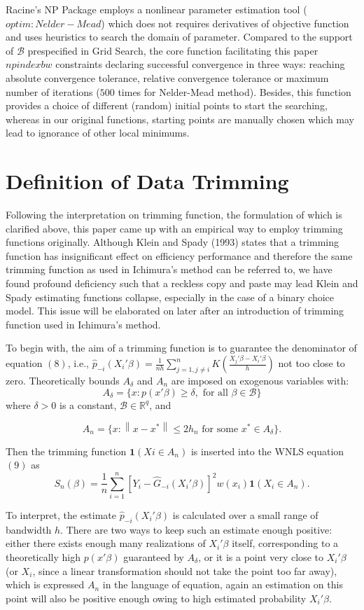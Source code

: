 \documentclass[a4paper]{article}
\newcommand{\norm}[1]{\left\lVert#1\right\rVert}
\begin{document}
Racine's NP Package employs a nonlinear parameter estimation tool ($optim: Nelder-Mead$) which does not requires derivatives of objective function and uses heuristics to search the domain of parameter. Compared to the support of $\mathcal{B}$ prespecified in Grid Search, the core function facilitating this paper $npindexbw$ constraints declaring successful convergence in three ways: reaching absolute convergence tolerance, relative convergence tolerance or maximum number of iterations ($500$ times for Nelder-Mead method). Besides, this function provides a choice of different (random) initial points to start the searching, whereas in our original functions, starting points are manually chosen which may lead to ignorance of other local minimums.

\section{Definition of Data Trimming}
Following the interpretation on trimming function, the formulation of which is clarified above, this paper came up with an empirical way to employ trimming functions originally. Although Klein and Spady (1993) states that a trimming function has insignificant effect on efficiency performance and therefore the same trimming function as used in Ichimura's method can be referred to, we have found profound deficiency such that a reckless copy and paste may lead Klein and Spady estimating functions collapse, especially in the case of a binary choice model. This issue will be elaborated on later after an introduction of trimming function used in Ichimura's method.

To begin with, the aim of a trimming function is to guarantee the denominator of equation $(8)$, i.e., $\hat{p}_{-i}(X_i'\beta) = \frac{1}{nh}\sum_{j=1,j \neq i}^{n}K(\frac{X_j'\beta - X_i'\beta}{h})$ not too close to zero. Theoretically bounds $A_\delta$ and $A_n$ are imposed on exogenous variables with:
\[ A_\delta = \{ x : p(x'\beta) \geq \delta, \text{ for all }  \beta \in \mathcal{B} \}
\]
where $\delta > 0$ is a constant, $\mathcal{B} \in \mathbb{R}^q$, and

\[ A_n = \{ x : \norm{x - x^*} \leq 2h_n \text{ for some } x^* \in A_\delta\}.
\]

Then the trimming function $\mathbf{1}{(Xi \in A_n)}$ is inserted into the WNLS equation $(9)$ as
\[
S_n(\beta) = \frac{1}{n} \sum_{i=1}^{n}  [Y_i - \hat{G}_{-i}(X_i'\beta)]^2w(x_i)\mathbf{1}{(X_i \in A_n)}.
\]

To interpret, the estimate $\hat{p}_{-i}(X_i'\beta)$ is calculated over a small range of bandwidth $h$. There are two ways to keep such an estimate enough positive: either there exists enough many realizations of $X_i'\beta$ itself, corresponding to a theoretically high $p(x'\beta)$ guaranteed by $A_\delta$, or it is a point very close to $X_i'\beta$ (or $X_i$, since a linear transformation should not take the point too far away), which is expressed $A_n$ in the language of equation, again an estimation on this point will also be positive enough owing to high estimated probability $X_i'\beta$.
\end{document}

